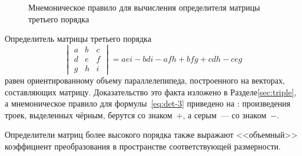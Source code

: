     \begin{wrapfigure}[8]{r}{0.25\tw}
        \vspace{-0.2pc}
        \centering
        \caption{Мнемоническое правило для вычисления определителя матрицы третьего порядка}
        \label{pic:det-3-dim}
    \end{wrapfigure}
    Определитель матрицы третьего порядка
    \begin{equation}
        \begin{vmatrix}
            a & b & c \\
            d & e & f \\
            g & h & i
        \end{vmatrix} = aei - bdi - afh + bfg + cdh - ceg
        \label{eq:det-3}
    \end{equation}
    равен ориентированному объему параллелепипеда, построенного на векторах, составляющих матрицу. Доказательство это факта изложено в Разделе\;\ref{sec:triple}, а мнемоническое правило для формулы~\eqref{eq:det-3} приведено на : произведения троек, выделенных чёрным, берутся со знаком~$+$, а серым~--- со знаком~$-$.
    
    Определители матриц более высокого порядка также выражают <<объемный>> коэффициент преобразования в пространстве соответствующей размерности.
    
